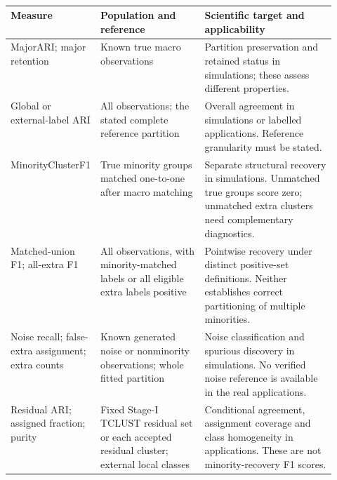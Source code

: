 \begin{table}[!htbp]
\caption{}
\label{tab:c1-metric-framework}
\centering\footnotesize\setlength{\tabcolsep}{3pt}
\begin{tabularx}{\linewidth}{p{0.22\linewidth}p{0.32\linewidth}X}
\toprule
\rowcolor{RevisionBackground} Measure & Population and reference & Scientific target and applicability \\
\midrule
\rowcolor{RevisionBackground} MajorARI; major retention & Known true macro observations & Partition preservation and retained status in simulations; these assess different properties. \\
\rowcolor{RevisionBackground} Global or external-label ARI & All observations; the stated complete reference partition & Overall agreement in simulations or labelled applications. Reference granularity must be stated. \\
\rowcolor{RevisionBackground} MinorityClusterF1 & True minority groups matched one-to-one after macro matching & Separate structural recovery in simulations. Unmatched true groups score zero; unmatched extra clusters need complementary diagnostics. \\
\rowcolor{RevisionBackground} Matched-union F1; all-extra F1 & All observations, with minority-matched labels or all eligible extra labels positive & Pointwise recovery under distinct positive-set definitions. Neither establishes correct partitioning of multiple minorities. \\
\rowcolor{RevisionBackground} Noise recall; false-extra assignment; extra counts & Known generated noise or nonminority observations; whole fitted partition & Noise classification and spurious discovery in simulations. No verified noise reference is available in the real applications. \\
\rowcolor{RevisionBackground} Residual ARI; assigned fraction; purity & Fixed Stage-I TCLUST residual set or each accepted residual cluster; external local classes & Conditional agreement, assignment coverage and class homogeneity in applications. These are not minority-recovery F1 scores. \\
\bottomrule
\end{tabularx}
\end{table}
